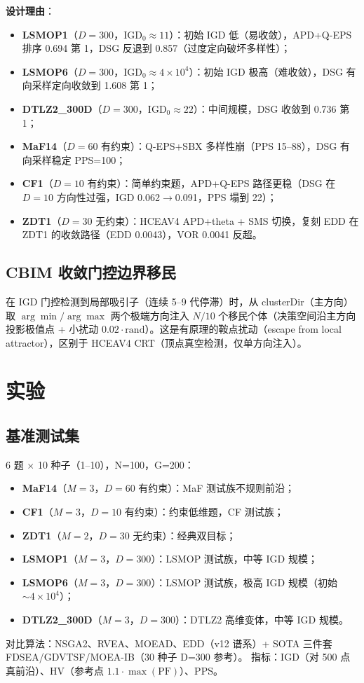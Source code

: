 \documentclass[a4paper,11pt]{article}
\begin{document}
\textbf{设计理由}：
\begin{itemize}
\item \textbf{LSMOP1}（$D=300$，$\text{IGD}_0\approx11$）：初始 IGD 低（易收敛），APD+Q-EPS 排序 0.694 第 1，DSG 反退到 0.857（过度定向破坏多样性）；
\item \textbf{LSMOP6}（$D=300$，$\text{IGD}_0\approx4\times10^4$）：初始 IGD 极高（难收敛），DSG 有向采样定向收敛到 1.608 第 1；
\item \textbf{DTLZ2\_300D}（$D=300$，$\text{IGD}_0\approx22$）：中间规模，DSG 收敛到 0.736 第 1；
\item \textbf{MaF14}（$D=60$ 有约束）：Q-EPS+SBX 多样性崩（PPS 15--88），DSG 有向采样稳定 PPS=100；
\item \textbf{CF1}（$D=10$ 有约束）：简单约束题，APD+Q-EPS 路径更稳（DSG 在 $D=10$ 方向性过强，IGD 0.062$\to$0.091，PPS 塌到 22）；
\item \textbf{ZDT1}（$D=30$ 无约束）：HCEAV4 APD+theta + SMS 切换，复刻 EDD 在 ZDT1 的收敛路径（EDD 0.0043），VOR 0.0041 反超。
\end{itemize}

\subsection{CBIM 收敛门控边界移民}
\label{sec:cbim}
在 IGD 门控检测到局部吸引子（连续 5--9 代停滞）时，从 clusterDir（主方向）取 $\arg\min/\arg\max$ 两个极端方向注入 $N/10$ 个移民个体（决策空间沿主方向投影极值点 + 小扰动 $0.02\cdot\text{rand}$）。这是有原理的鞍点扰动（escape from local attractor），区别于 HCEAV4 CRT（顶点真空检测，仅单方向注入）。

\section{实验}
\label{sec:exp}

\subsection{基准测试集}
6 题 $\times$ 10 种子（1--10），N=100，G=200：
\begin{itemize}
\item \textbf{MaF14}（$M=3$，$D=60$ 有约束）：MaF 测试族不规则前沿；
\item \textbf{CF1}（$M=3$，$D=10$ 有约束）：约束低维题，CF 测试族；
\item \textbf{ZDT1}（$M=2$，$D=30$ 无约束）：经典双目标；
\item \textbf{LSMOP1}（$M=3$，$D=300$）：LSMOP 测试族，中等 IGD 规模；
\item \textbf{LSMOP6}（$M=3$，$D=300$）：LSMOP 测试族，极高 IGD 规模（初始 $\sim4\times10^4$）；
\item \textbf{DTLZ2\_300D}（$M=3$，$D=300$）：DTLZ2 高维变体，中等 IGD 规模。
\end{itemize}
对比算法：NSGA2、RVEA、MOEAD、EDD（v12 谱系）+ SOTA 三件套 FDSEA/GDVTSF/MOEA-IB（30 种子 D=300 参考）。
指标：IGD（对 500 点真前沿）、HV（参考点 $1.1\cdot\max(\text{PF})$）、PPS。
\end{document}
